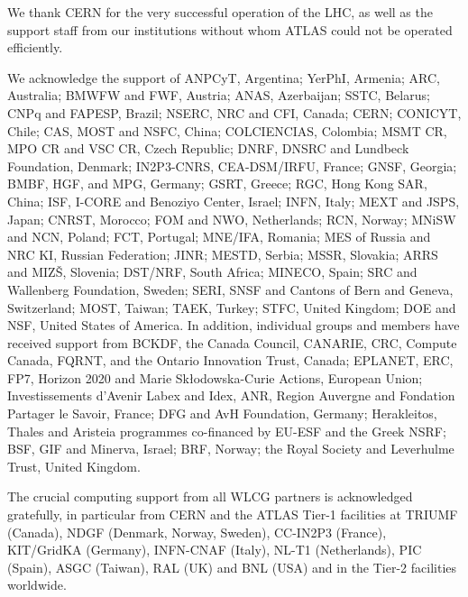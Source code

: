 

We thank CERN for the very successful operation of the LHC, as well as the
support staff from our institutions without whom ATLAS could not be
operated efficiently.

We acknowledge the support of ANPCyT, Argentina; YerPhI, Armenia; ARC, Australia; BMWFW and FWF, Austria; ANAS, Azerbaijan; SSTC, Belarus; CNPq and FAPESP, Brazil; NSERC, NRC and CFI, Canada; CERN; CONICYT, Chile; CAS, MOST and NSFC, China; COLCIENCIAS, Colombia; MSMT CR, MPO CR and VSC CR, Czech Republic; DNRF, DNSRC and Lundbeck Foundation, Denmark; IN2P3-CNRS, CEA-DSM/IRFU, France; GNSF, Georgia; BMBF, HGF, and MPG, Germany; GSRT, Greece; RGC, Hong Kong SAR, China; ISF, I-CORE and Benoziyo Center, Israel; INFN, Italy; MEXT and JSPS, Japan; CNRST, Morocco; FOM and NWO, Netherlands; RCN, Norway; MNiSW and NCN, Poland; FCT, Portugal; MNE/IFA, Romania; MES of Russia and NRC KI, Russian Federation; JINR; MESTD, Serbia; MSSR, Slovakia; ARRS and MIZ\v{S}, Slovenia; DST/NRF, South Africa; MINECO, Spain; SRC and Wallenberg Foundation, Sweden; SERI, SNSF and Cantons of Bern and Geneva, Switzerland; MOST, Taiwan; TAEK, Turkey; STFC, United Kingdom; DOE and NSF, United States of America. In addition, individual groups and members have received support from BCKDF, the Canada Council, CANARIE, CRC, Compute Canada, FQRNT, and the Ontario Innovation Trust, Canada; EPLANET, ERC, FP7, Horizon 2020 and Marie Skłodowska-Curie Actions, European Union; Investissements d'Avenir Labex and Idex, ANR, Region Auvergne and Fondation Partager le Savoir, France; DFG and AvH Foundation, Germany; Herakleitos, Thales and Aristeia programmes co-financed by EU-ESF and the Greek NSRF; BSF, GIF and Minerva, Israel; BRF, Norway; the Royal Society and Leverhulme Trust, United Kingdom.

The crucial computing support from all WLCG partners is acknowledged
gratefully, in particular from CERN and the ATLAS Tier-1 facilities at
TRIUMF (Canada), NDGF (Denmark, Norway, Sweden), CC-IN2P3 (France),
KIT/GridKA (Germany), INFN-CNAF (Italy), NL-T1 (Netherlands), PIC (Spain),
ASGC (Taiwan), RAL (UK) and BNL (USA) and in the Tier-2 facilities
worldwide.

